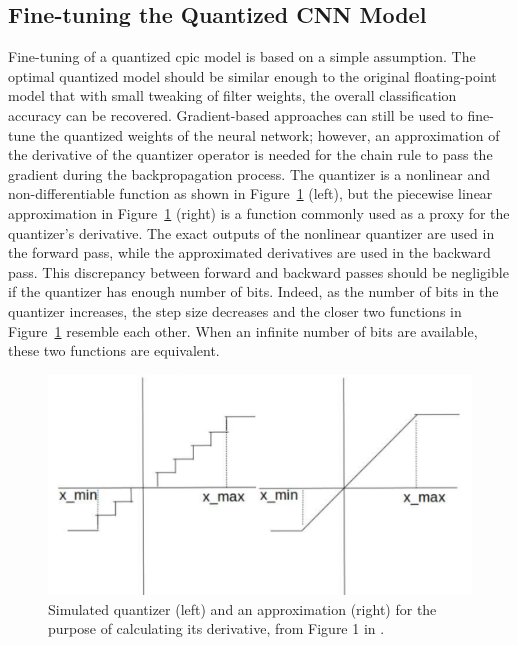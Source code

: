 \documentclass{article}
\begin{document}
\subsection{Fine-tuning the Quantized CNN Model}
\label{sec:fine_tuning}
%
Fine-tuning of a quantized \gls{cpic} model is based on a simple assumption.
The optimal quantized model should be similar enough to the original floating-point model that with small tweaking of filter weights, the overall classification accuracy can be recovered.
Gradient-based approaches can still be used to fine-tune the quantized weights of the neural network; however, an approximation of the derivative of the quantizer operator is needed for the chain rule to pass the gradient during the backpropagation process.
The quantizer is a nonlinear and non-differentiable function as shown in Figure~\ref{fig:quant_derivative} (left), but the piecewise linear approximation in 
Figure~\ref{fig:quant_derivative} (right) is a function commonly used as a proxy for the quantizer's derivative.
The exact outputs of the nonlinear quantizer are used in the forward pass, while the approximated derivatives are used in the backward pass.
This discrepancy between forward and backward passes should be negligible if the quantizer has enough number of bits.
Indeed, as the number of bits in the quantizer increases, the step size decreases and the closer two functions in Figure~\ref{fig:quant_derivative} resemble each other.
When an infinite number of bits are available, these two functions are equivalent.
%
\begin{figure}
    \centering
    \includegraphics[width=0.68\linewidth]{quant_derivative}
    \caption{Simulated quantizer (left) and an approximation (right) for the purpose of calculating its derivative, from Figure 1 in \textcite{krishnamoorthi2018quantizing}.}
    \label{fig:quant_derivative}
\end{figure}
%
\end{document}
